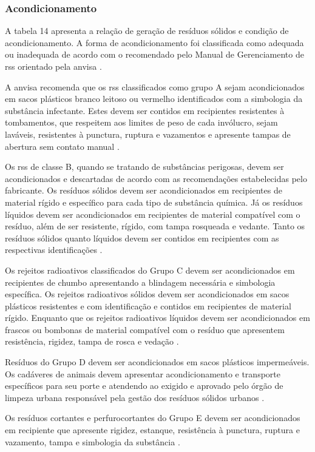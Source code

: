 	\subsubsection{Acondicionamento}
	A tabela 14 apresenta a relação de geração de resíduos sólidos e condição de acondicionamento. A forma de acondicionamento foi classificada como adequada ou inadequada de acordo com o recomendado pelo Manual de Gerenciamento de \gls{rss} orientado pela \gls{anvisa} \cite{anvisa:2006}. 
	
	A \gls{anvisa} recomenda que os \gls{rss} classificados como grupo A sejam acondicionados em sacos plásticos branco leitoso ou vermelho identificados com a simbologia da substância infectante. Estes devem ser contidos em recipientes resistentes à tombamentos, que respeitem aos limites de peso de cada invólucro, sejam laváveis, resistentes à punctura, ruptura e vazamentos e apresente tampas de abertura sem contato manual \cite{anvisa:2006}.
	
	Os \gls{rss} de classe B, quando se tratando de substâncias perigosas, devem ser acondicionados e descartadas de acordo com as recomendações estabelecidas pelo fabricante. Os resíduos sólidos devem ser acondicionados em recipientes de material rígido e específico para cada tipo de substância química. Já os resíduos líquidos devem ser acondicionados em recipientes de material compatível com o resíduo, além de ser resistente, rígido, com tampa rosqueada e vedante. Tanto os resíduos sólidos quanto líquidos devem ser contidos em recipientes com as respectivas identificações \cite{anvisa:2006}.
	
	Os rejeitos radioativos classificados do Grupo C devem ser acondicionados em recipientes de chumbo apresentando a blindagem necessária e simbologia específica. Os rejeitos radioativos sólidos devem ser acondicionados em sacos plásticos resistentes e com identificação e contidos em recipientes de material rígido. Enquanto que os rejeitos radioativos líquidos devem ser acondicionados em frascos ou bombonas de material compatível com o resíduo que apresentem resistência, rigidez, tampa de rosca e vedação \cite{anvisa:2006}. 
	
	Resíduos do Grupo D devem ser acondicionados em sacos plásticos impermeáveis. Os cadáveres de animais devem apresentar acondicionamento e transporte específicos para seu porte e atendendo ao exigido e aprovado pelo órgão de limpeza urbana responsável pela gestão dos resíduos sólidos urbanos \cite{anvisa:2006}.
	
	Os resíduos cortantes e perfurocortantes do Grupo E devem ser acondicionados em recipiente que apresente rigidez, estanque, resistência à punctura, ruptura e vazamento, tampa e simbologia da substância \cite{anvisa:2006}.
	
